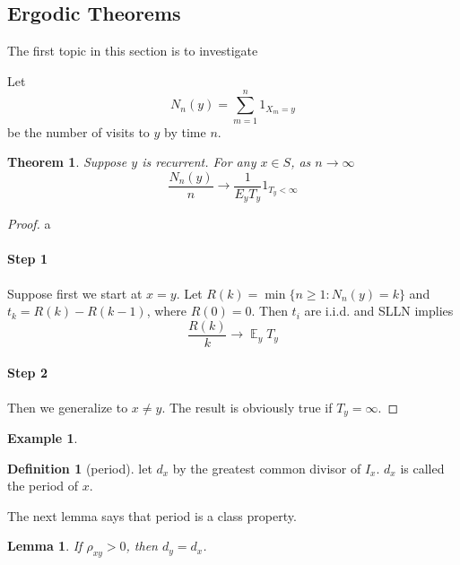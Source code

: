 \documentclass{article}
\newtheorem{Thm}{Theorem}[section]
\newtheorem{Lem}{Lemma}[section]
\newtheorem{Eg}{Example}[section]
\theoremstyle{definition}
\newtheorem{Def}{Definition}[section]
\newcommand{\EE}{\operatorname{\mathbb{E}}}
\renewcommand{\geq}{\geqslant}
\newcommand{\<}{\left\langle}
\renewcommand{\>}{\right\rangle}
\begin{document}
\subsection{Ergodic Theorems}
The first topic in this section is to investigate 

Let \[N_n(y)=\sum_{m=1}^{n}1_{X_m=y} \] 
be the number of visits to $y$ by time $n$.

\begin{Thm}
    Suppose $y$ is recurrent. For any $x\in S$, as $n\to\infty$ 
    \[ \frac{N_n(y)}{n}\to \frac{1}{E_y T_y}1_{T_y<\infty} \]
\end{Thm}
\begin{proof}
    a
    \paragraph{Step 1} Suppose first we start at $x=y$. Let $R(k)=\min \{n\geq 1:N_n(y)=k \}$ and $t_k=R(k)-R(k-1)$, where $R(0)=0$.
    Then $t_i$ are i.i.d. and SLLN implies \[\frac{R(k)}{k}\to \EE_y T_y \] 

    \paragraph{Step 2} Then we generalize to $x\ne y$. The result is obviously true if $T_y=\infty$.
\end{proof}

\begin{Eg}
    
\end{Eg}
\begin{Def}[period]
    let $d_x$ by the greatest common divisor of $I_x$. $d_x$ is called the period of $x$.
\end{Def}
The next lemma says that period is a class property.
\begin{Lem}
    If $\rho_{xy}>0$, then $d_y=d_x$.
\end{Lem}
\end{document}
